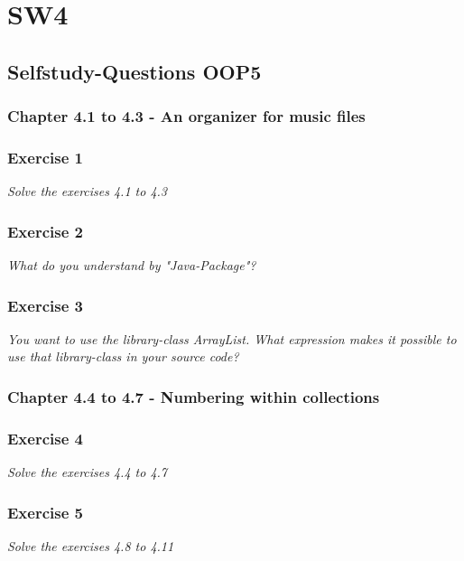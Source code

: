 \section{SW4}
\subsection{Selfstudy-Questions OOP5}

\subsubsection{Chapter 4.1 to 4.3 - An organizer for music files}

\subsubsection*{Exercise 1}
\textit{Solve the exercises 4.1 to 4.3}\\

\subsubsection*{Exercise 2}
\textit{What do you understand by "Java-Package"?}\\

\subsubsection*{Exercise 3}
\textit{You want to use the library-class ArrayList. What expression makes it
possible to use that library-class in your source code?}\\

\subsubsection{Chapter 4.4 to 4.7 - Numbering within collections}

\subsubsection*{Exercise 4}
\textit{Solve the exercises 4.4 to 4.7}\\

\subsubsection*{Exercise 5}
\textit{Solve the exercises 4.8 to 4.11}\\


